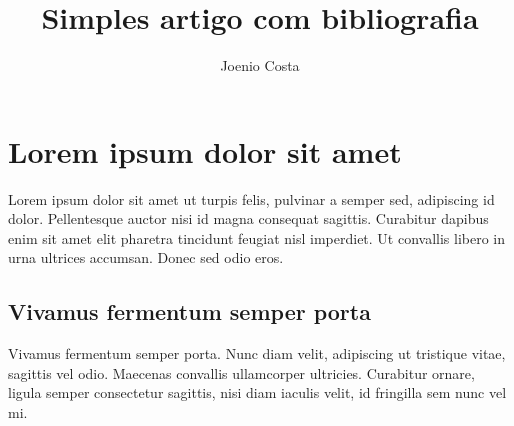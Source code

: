 \documentclass{article}
\begin{document}
\title{Simples artigo com bibliografia}

\author{Joenio Costa}

\maketitle

\section{Lorem ipsum dolor sit amet}

Lorem ipsum dolor sit amet\cite{Pressman2005} ut turpis felis, pulvinar a
semper sed, adipiscing id dolor. Pellentesque\cite{Mafra2006} auctor nisi id
magna consequat sagittis.  Curabitur dapibus enim sit amet elit pharetra
tincidunt feugiat nisl imperdiet. Ut convallis libero in urna ultrices
accumsan. Donec sed odio eros\cite{Hassan2005}.

\subsection{Vivamus fermentum semper porta}

Vivamus fermentum semper porta. Nunc diam velit, adipiscing ut tristique
vitae, sagittis vel odio\cite{WikipediaCPP}. Maecenas convallis ullamcorper
ultricies. Curabitur ornare, ligula semper consectetur sagittis, nisi diam
iaculis velit, id fringilla sem nunc vel mi.


\end{document}
